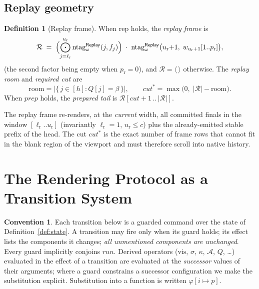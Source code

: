 \documentclass[11pt]{article}
\newcommand{\seq}[1]{\langle #1\rangle}
\newcommand{\emptyseq}{\seq{\,}}
\newcommand{\len}[1]{\lvert #1\rvert}
\newcommand{\cat}{\mathbin{\cdot}}             %
\newcommand{\Cat}{\bigodot}                    %
\newcommand{\BlRow}{\square}                   %
\newcommand{\Bcell}{\beta}                     %
\newcommand{\srcRep}{\mathsf{Replay}}
\newcommand{\ntg}{\mathrm{ntag}}
\newcommand{\vis}{\mathrm{vis}}
\newcommand{\AOK}{\mathcal{A}}
\newcommand{\Canon}{\kappa}
\newcommand{\Repl}{\mathrm{rep}}
\newcommand{\RRows}{\mathcal{R}}
\newcommand{\Room}{\mathrm{room}}
\newcommand{\Scr}{Q}
\newcommand{\rcur}{\ell_{\mathrm{r}}}
\newcommand{\rend}{u_{\mathrm{r}}}
\newcommand{\rpart}{p_{\mathrm{r}}}
\newcommand{\rprep}{\mathit{prep}}
\newcommand{\rcut}{\mathit{cut}}
\newcommand{\run}{\mathit{run}}
\theoremstyle{definition}
\newtheorem{definition}[theorem]{Definition}
\newtheorem{convention}[theorem]{Convention}
\theoremstyle{remark}
\begin{document}
\subsection{Replay geometry}\label{sec:replaygeo}

\begin{definition}[Replay frame]\label{def:replayrows}
When $\Repl$ holds, the \emph{replay frame} is
\[
  \RRows \;=\;
  \Bigl(\Cat_{j=\rcur}^{\rend} \ntg^{\srcRep}_{\omega}(j,f_j)\Bigr)
  \;\cat\;
  \ntg^{\srcRep}_{\omega}\bigl(\rend{+}1,\; w_{\rend+1}[1..\rpart]\bigr),
\]
(the second factor being empty when $\rpart=0$), and $\RRows=\emptyseq$
otherwise. The \emph{replay room} and \emph{required cut} are
\[
  \Room=\bigl|\{\,j\in[h] : \Scr[j]=\Bcell\,\}\bigr|,
  \qquad
  \rcut^{*}=\max\bigl(0,\;\len{\RRows}-\Room\bigr).
\]
When $\rprep$ holds, the \emph{prepared tail} is
$\RRows[\rcut{+}1\,..\,\len{\RRows}]$.
\end{definition}

The replay frame re-renders, at the \emph{current} width, all committed finals
in the window $[\rcur..\rend]$ (invariantly $\rcur=1$, $\rend\le c$) plus the
already-emitted stable prefix of the head. The cut $\rcut^{*}$ is the exact
number of frame rows that cannot fit in the blank region of the viewport and
must therefore scroll into native history.

\section{The Rendering Protocol as a Transition System}\label{sec:protocol}

\begin{convention}\label{conv:trans}
Each transition below is a guarded command over the state of
Definition~\ref{def:state}. A transition may fire only when its guard holds;
its effect lists the components it changes; \emph{all unmentioned components
are unchanged}. Every guard implicitly conjoins $\run$. Derived operators
($\vis$, $\sigma$, $\Canon$, $\AOK$, $\Scr$, \dots) evaluated in the effect of
a transition are evaluated at the \emph{successor} values of their arguments;
where a guard constrains a successor configuration we make the substitution
explicit. Substitution into a function is written
$\varphi[i\mapsto p]$.
\end{convention}
\end{document}
